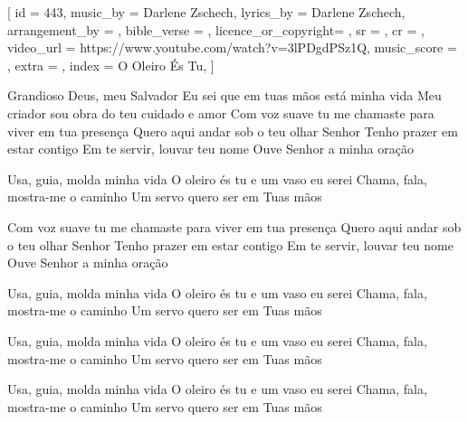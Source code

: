 [
    id                  = {443},
    music_by            = {Darlene Zschech}, %
    lyrics_by           = {Darlene Zschech}, %
    arrangement_by      = {}, %
    bible_verse         = {},
    licence_or_copyright= {},
    sr                  = {},
    cr                  = {},
    video_url           = {https://www.youtube.com/watch?v=3lPDgdPSz1Q}, 
    music_score         = {},
    extra               = {},
    index               = {O Oleiro És Tu},
]

\beginverse
Grandioso Deus, meu Salvador
Eu sei que em tuas mãos está minha vida
Meu criador sou obra do teu cuidado e amor
Com voz suave tu me chamaste para viver em tua presença
Quero aqui andar sob o teu olhar Senhor
Tenho prazer em estar contigo
Em te servir, louvar teu nome
Ouve Senhor a minha oração


\endverse

\beginchorus
Usa, guia, molda minha vida
O oleiro és tu e um vaso eu serei
Chama, fala, mostra-me o caminho
Um servo quero ser em Tuas mãos
\endchorus

\beginverse
Com voz suave tu me chamaste para viver em tua presença
Quero aqui andar sob o teu olhar Senhor
Tenho prazer em estar contigo
Em te servir, louvar teu nome
Ouve Senhor a minha oração
\endverse

\beginchorus
Usa, guia, molda minha vida
O oleiro és tu e um vaso eu serei
Chama, fala, mostra-me o caminho
Um servo quero ser em Tuas mãos
\endchorus

\beginchorus
Usa, guia, molda minha vida
O oleiro és tu e um vaso eu serei
Chama, fala, mostra-me o caminho
Um servo quero ser em Tuas mãos
\endchorus

\beginchorus
Usa, guia, molda minha vida
O oleiro és tu e um vaso eu serei
Chama, fala, mostra-me o caminho
Um servo quero ser em Tuas mãos
\endchorus

\endsong
